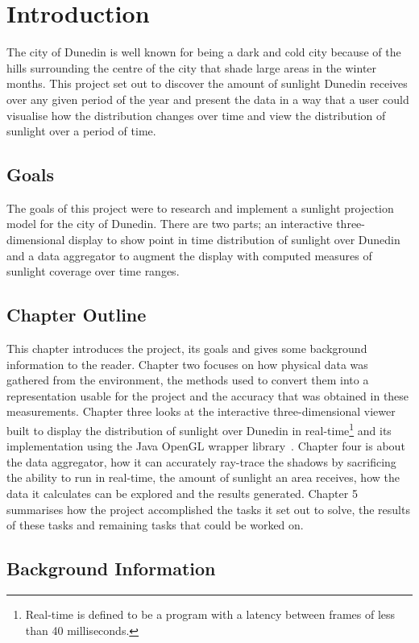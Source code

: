 \documentclass[12pt]{report}
\begin{document}
\chapter{Introduction}
The city of Dunedin is well known for being a dark and cold city because of the hills surrounding the centre of the city that shade large areas in the winter months. This project set out to discover the amount of sunlight Dunedin receives over any given period of the year and present the data in a way that a user could visualise how the distribution changes over time and view the distribution of sunlight over a period of time.

\section{Goals}
The goals of this project were to research and implement a sunlight projection model for the city of Dunedin. There are two parts; an interactive three-dimensional display to show point in time distribution of sunlight over Dunedin and a data aggregator to augment the display with computed measures of sunlight coverage over time ranges.

\section{Chapter Outline}
This chapter introduces the project, its goals and gives some background information to the reader. Chapter two focuses on how physical data was gathered from the environment, the methods used to convert them into a representation usable for the project and the accuracy that was obtained in these measurements. Chapter three looks at the interactive three-dimensional viewer built to display the distribution of sunlight over Dunedin in real-time\footnote{Real-time is defined to be a program with a latency between frames of less than 40 milliseconds.} and its implementation using the Java OpenGL wrapper library~\cite{JOGL}. Chapter four is about the data aggregator, how it can accurately ray-trace the shadows by sacrificing the ability to run in real-time, the amount of sunlight an area receives, how the data it calculates can be explored and the results generated. Chapter 5 summarises how the project accomplished the tasks it set out to solve, the results of these tasks and remaining tasks that could be worked on.

\section{Background Information}
\end{document}
